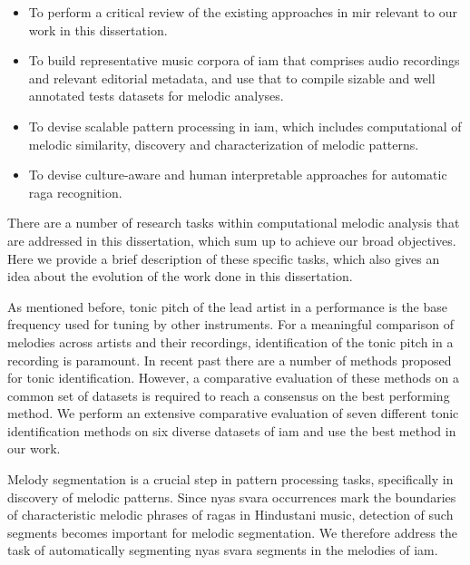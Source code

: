 \begin{itemize}
	\item To perform a critical review of the existing approaches in \gls{mir} relevant to our work in this dissertation.
	\item To build representative music corpora of \gls{iam} that comprises audio recordings and relevant editorial metadata, and use that to compile sizable and well annotated tests datasets for melodic analyses.
	\item To devise scalable pattern processing in \gls{iam}, which includes computational of melodic similarity, discovery and characterization of melodic patterns.
	\item To devise culture-aware and human interpretable approaches for automatic \gls{raga} recognition.
\end{itemize}

There are a number of research tasks within computational melodic analysis that are addressed in this dissertation, which sum up to achieve our broad objectives. Here we provide a brief description of these specific tasks, which also gives an idea about the evolution of the work done in this dissertation.

As mentioned before, tonic pitch of the lead artist in a performance is the base frequency used for tuning by other instruments. For a meaningful comparison of melodies across artists and their recordings, identification of the tonic pitch in a recording is paramount. In recent past there are a number of methods proposed for tonic identification. However, a comparative evaluation of these methods on a common set of datasets is required to reach a consensus on the best performing method. We perform an extensive comparative evaluation of seven different tonic identification methods on six diverse datasets of \gls{iam} and use the best method in our work.

Melody segmentation is a crucial step in pattern processing tasks, specifically in discovery of melodic patterns. Since \gls{nyas} \gls{svara} occurrences mark the boundaries of characteristic melodic phrases of \glspl{raga} in Hindustani music, detection of such segments becomes important for melodic segmentation. We therefore address the task of automatically segmenting \gls{nyas} \gls{svara} segments in the melodies of \gls{iam}.





